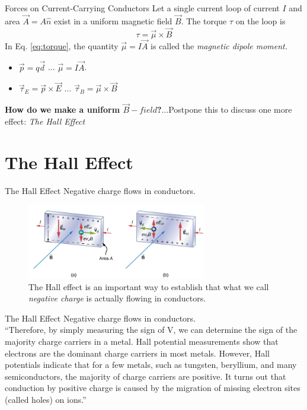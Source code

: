\documentclass{beamer}
\begin{document}
\begin{frame}{Forces on Current-Carrying Conductors}
Let a single current loop of current $I$ and area $\vec{A} = A \hat{n}$ exist in a uniform magnetic field $\vec{B}$.  The torque $\tau$ on the loop is
\begin{equation}
\boxed{
\tau = \vec{\mu} \times \vec{B} \label{eq:torque}
}
\end{equation}
In Eq. \ref{eq:torque}, the quantity $\vec{\mu} = I\vec{A}$ is called the \textit{magnetic dipole moment.}
\begin{itemize}
\item $\vec{p} = q\vec{d}$ ... $\vec{\mu} = I\vec{A}$.
\item $\vec{\tau}_E = \vec{p} \times \vec{E}$ ... $\vec{\tau}_B = \vec{\mu} \times \vec{B}$
\end{itemize}
\textbf{How do we make a uniform $\vec{B}-field$?}...Postpone this to discuss one more effect: \textit{The Hall Effect}
\end{frame}

\section{The Hall Effect}

\begin{frame}{The Hall Effect}
Negative charge flows in conductors.
\begin{figure}
\centering
\includegraphics[width=0.7\textwidth]{figures/Hall.png}
\caption{\label{fig:Hall} The Hall effect is an important way to establish that what we call \textit{negative charge} is actually flowing in conductors.}
\end{figure}
\end{frame}

\begin{frame}{The Hall Effect}
Negative charge flows in conductors. \\ \vspace{0.5cm}
``Therefore, by simply measuring the sign of V, we can determine the sign of the majority charge carriers in a metal.
Hall potential measurements show that electrons are the dominant charge carriers in most metals. However, Hall potentials
indicate that for a few metals, such as tungsten, beryllium, and many semiconductors, the majority of charge carriers are
positive. It turns out that conduction by positive charge is caused by the migration of missing electron sites (called holes) on
ions.''
\end{frame}
\end{document}
